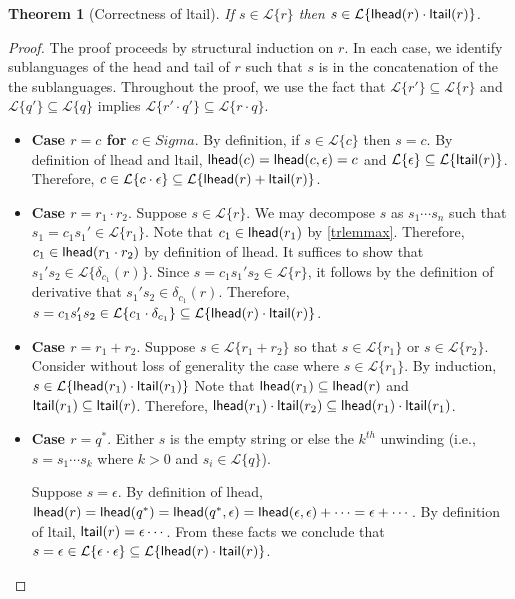 \documentclass[11pt,leqno]{article}
\newtheorem{trthm}[tr]{Theorem}
\theoremstyle{definition}
\newcommand{\Lagr}{\mathcal{L}}
\newcommand{\lang}[1]{\Lagr\{#1\}}
\newcommand{\lhead}[1]{ {\sf lhead}(#1) }
\newcommand{\ltail}[1]{ {\sf ltail}(#1) }
\begin{document}
\begin{trthm}[Correctness of \textsf{ltail}]
If $s \in \lang{r}$ then $s \in \lang{\lhead{r} \cdot \ltail{r}}$.
\end{trthm}
\begin{proof}
The proof proceeds by structural induction on $r$.
In each case, we identify sublanguages of the head and tail of $r$ such that 
$s$ is in the concatenation of the the sublanguages.
Throughout the proof, we use the fact that $\lang{r'} \subseteq \lang{r}$ and $\lang{q'} \subseteq \lang{q}$
implies $\lang{r' \cdot q'} \subseteq \lang{r \cdot q}$.

\begin{itemize}[label=$ $,itemsep=1ex]

\item \textbf{Case $r = c$ for $c \in Sigma$}.
By definition, if $s \in \lang{c}$ then $s = c$.
By definition of lhead and ltail, $\lhead{c} = \lhead{c, \epsilon} = c$
and $\lang{\epsilon} \subseteq \lang{\ltail{r}}$.
Therefore, $c \in \lang{c \cdot \epsilon} \subseteq \lang{\lhead{r} + \ltail{r}}$.

\item \textbf{Case $r = r_1 \cdot r_2$}.
Suppose $s \in \lang{r}$.
We may decompose $s$ as $s_1  \cdots s_n$ such that $s_1 = c_1 s_1' \in \lang{r_1}$.
Note that $c_1 \in \lhead{r_1}$ by \ref{trlemmax}.
Therefore, $c_1 \in \lhead{r_1 \cdot r_2}$ by definition of lhead.
It suffices to show that $s_1' s_2 \in \lang{\delta_{c_1}(r)}$.
Since $s = c_1 s_1' s_2\in \lang{r}$, it follows by the definition of derivative that $s_1' s_2 \in \delta_{c_1}(r)$.
Therefore, $s = c_1 s_1' s_2 \in \lang{ c_1 \cdot \delta_{c_1} } \subseteq \lang{ \lhead{r} \cdot \ltail{r}}$.


\item \textbf{Case $r = r_1 + r_2$}.
Suppose $s \in \lang{r_1 + r_2}$
so that $s \in \lang{r_1}$ or $s \in \lang{r_2}$.
Consider without loss of generality the case where $s \in \lang{r_1}$.
By induction, $s \in \lang{\lhead{r_1} \cdot \ltail{r_1}}$
Note that $\lhead{r_1} \subseteq \lhead{r}$
and $\ltail{r_1} \subseteq \ltail{r}$.
Therefore, $\lhead{r_1} \cdot \ltail{r_2} \subseteq \lhead{r_1} \cdot \ltail{r_1}$.


\item \textbf{Case $r = q^*$}.
Either $s$ is the empty string or else the $k^{th}$ unwinding (i.e., $s = s_1 \cdots s_k$ where $k > 0$ and $s_i \in \lang{q}$).

Suppose $s = \epsilon$.
By definition of lhead, $\lhead{r} = \lhead{q^*} = \lhead{q^*, \epsilon} = \lhead{\epsilon, \epsilon} + \cdots = \epsilon + \cdots$.
By definition of ltail, $\ltail{r} = \epsilon \cdots$.
From these facts we conclude that $s = \epsilon \in \lang{\epsilon \cdot \epsilon} \subseteq \lang{\lhead{r} \cdot \ltail{r}}$.


\end{itemize}
\end{proof}
\end{document}
